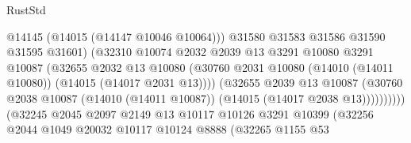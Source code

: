 \begin{lexlean}{RustStd}
\begin{coremodule}
                                            @14145
                                            (@14015 (@14147 @10046 @10064)))
                                          @31580
                                          @31583
                                          @31586
                                          @31590
                                          @31595
                                          @31601)
                                        (@32310
                                          @10074
                                          @2032
                                          @2039
                                          @13
                                          @3291
                                          @10080
                                          @3291
                                          @10087
                                          (@32655
                                            @2032
                                            @13
                                            @10080
                                            (@30760
                                              @2031
                                              @10080
                                              (@14010 (@14011 @10080))
                                              (@14015 (@14017 @2031 @13))))
                                          (@32655
                                            @2039
                                            @13
                                            @10087
                                            (@30760
                                              @2038
                                              @10087
                                              (@14010 (@14011 @10087))
                                              (@14015 (@14017 @2038 @13))))))))))
                              (@32245
                                @2045
                                @2097
                                @2149
                                @13
                                @10117
                                @10126
                                @3291
                                @10399
                                (@32256
                                  @2044
                                  @1049
                                  @20032
                                  @10117
                                  @10124
                                  @8888
                                  (@32265
                                    @1155
                                    @53

\end{coremodule}
\end{lexlean}
